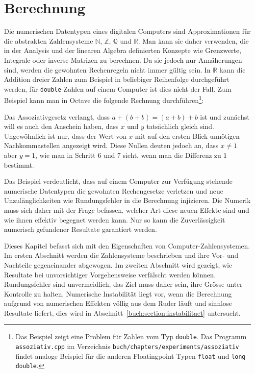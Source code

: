 %
%
%
\chapter{Berechnung
\label{chapter:berechnung}}
\rhead{}
Die numerischen Datentypen eines digitalen Computers sind Approximationen
für die abstrakten Zahlensysteme $\mathbb{N}$, $\mathbb{Z}$, $\mathbb{Q}$
und $\mathbb{R}$.
%
%
%
%
%
Man kann sie daher verwenden, die in der Analysis und der linearen Algebra
definierten Konzepte wie Grenzwerte, Integrale oder inverse Matrizen zu
berechnen.
Da sie jedoch nur Annäherungen sind, werden die gewohnten Rechenregeln 
nicht immer gültig sein.
%
In $\mathbb{R}$ kann die Addition dreier Zahlen zum Beispiel in beliebiger
Reihenfolge durchgeführt werden, für \texttt{double}-Zahlen auf einem
Computer ist dies nicht der Fall.
Zum Beispiel kann man in Octave die folgende Rechnung durchführen\footnote{%
Das Beispiel zeigt eine Problem für Zahlen vom Typ \texttt{double}.
Das Programm \texttt{assoziativ.cpp} im Verzeichnis
\texttt{buch/chapters/experiments/assoziativ} findet analoge Beispiel für
die anderen Floatingpoint Typen \texttt{float} und \texttt{long double}.}:

%
%
%
Das Assoziativgesetz verlangt, dass $a+(b+b)=(a+b)+b$ ist und zunächst
will es auch den Anschein haben, dass $x$ und $y$ tatsächlich gleich sind.
Ungewöhnlich ist nur, dass der Wert von $x$ mit auf den ersten Blick
unnötigen Nachkommastellen angezeigt wird.
Diese Nullen deuten jedoch an, dass $x\ne 1$ aber $y=1$, wie man in Schritt
6 und 7 sieht, wenn man die Differenz zu $1$ bestimmt.

Das Beispiel verdeutlicht, dass auf einem Computer zur Verfügung
stehende numerische Datentypen die gewohnten Rechengesetze verletzen und
neue Unzulänglichkeiten wie Rundungsfehler in die Berechnung injizieren.
Die Numerik muss sich daher mit der Frage befassen, welcher Art diese
neuen Effekte sind und wie ihnen effektiv begegnet werden kann.
Nur so kann die Zuverlässigkeit numerisch gefundener Resultate
garantiert werden.

Dieses Kapitel befasst sich mit den Eigenschaften von Computer-Zahlensystemen.
Im ersten Abschnitt werden die Zahlensysteme beschrieben und ihre 
Vor- und Nachteile gegeneinander abgewogen.
Im zweiten Abschnitt wird gezeigt, wie Resultate bei unvorsichtiger
Vorgehensweise verfälscht werden können.
Rundungsfehler sind unvermeidlich, das Ziel muss daher sein, ihre
Grösse unter Kontrolle zu halten.
Numerische Instabilität liegt vor, wenn die Berechnung aufgrund von
numerischen Effekten völlig aus dem Ruder läuft und sinnlose Resultate
liefert, dies wird in Abschnitt~\ref{buch:section:instabilitaet}
untersucht.
%
%



